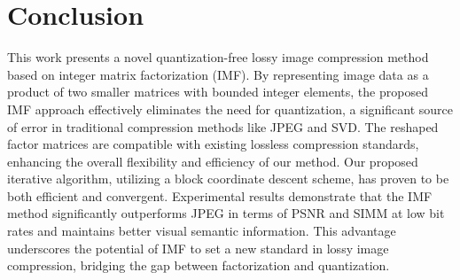 \section{Conclusion} \label{sec:conclusion}

This work presents a novel quantization-free lossy image compression method based on integer matrix factorization (IMF). By representing image data as a product of two smaller matrices with bounded integer elements, the proposed IMF approach effectively eliminates the need for quantization, a significant source of error in traditional compression methods like JPEG and SVD. The reshaped factor matrices are compatible with existing lossless compression standards, enhancing the overall flexibility and efficiency of our method. Our proposed iterative algorithm, utilizing a block coordinate descent scheme, has proven to be both efficient and convergent. Experimental results demonstrate that the IMF method significantly outperforms JPEG in terms of PSNR and SIMM at low bit rates and maintains better visual semantic information. This advantage underscores the potential of IMF to set a new standard in lossy image compression, bridging the gap between factorization and quantization.


